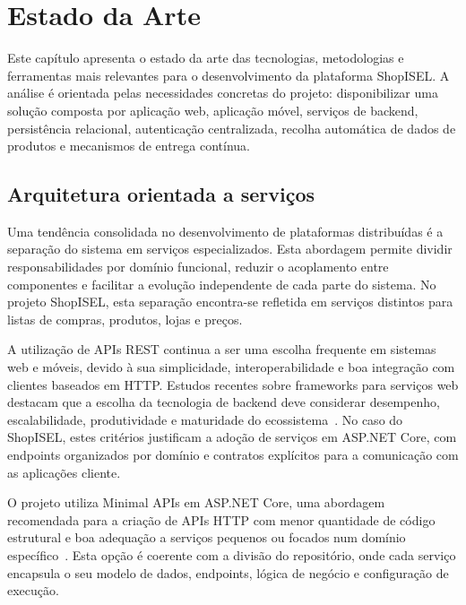 
\chapter{Estado da Arte}
\label{chap:2}

Este capítulo apresenta o estado da arte das tecnologias, metodologias e ferramentas
mais relevantes para o desenvolvimento da plataforma ShopISEL. A análise é orientada
pelas necessidades concretas do projeto: disponibilizar uma solução composta por
aplicação web, aplicação móvel, serviços de backend, persistência relacional,
autenticação centralizada, recolha automática de dados de produtos e mecanismos de
entrega contínua.

\section{Arquitetura orientada a serviços}
\label{sec:2.2}

Uma tendência consolidada no desenvolvimento de plataformas distribuídas é a
separação do sistema em serviços especializados. Esta abordagem permite dividir
responsabilidades por domínio funcional, reduzir o acoplamento entre componentes e
facilitar a evolução independente de cada parte do sistema. No projeto ShopISEL, esta
separação encontra-se refletida em serviços distintos para listas de compras,
produtos, lojas e preços.

A utilização de \ac{API}s \ac{REST} continua a ser uma escolha frequente em sistemas
web e móveis, devido à sua simplicidade, interoperabilidade e boa integração com
clientes baseados em \ac{HTTP}. Estudos recentes sobre frameworks para serviços web
destacam que a escolha da tecnologia de backend deve considerar desempenho,
escalabilidade, produtividade e maturidade do ecossistema~\cite{zanevych-2024}. No
caso do ShopISEL, estes critérios justificam a adoção de serviços em ASP.NET Core,
com endpoints organizados por domínio e contratos explícitos para a comunicação com
as aplicações cliente.

O projeto utiliza Minimal \ac{API}s em ASP.NET Core, uma abordagem recomendada para
a criação de \ac{API}s \ac{HTTP} com menor quantidade de código estrutural e boa
adequação a serviços pequenos ou focados num domínio específico~\cite{microsoft-minimal-apis}.
Esta opção é coerente com a divisão do repositório, onde cada serviço encapsula o seu
modelo de dados, endpoints, lógica de negócio e configuração de execução.


